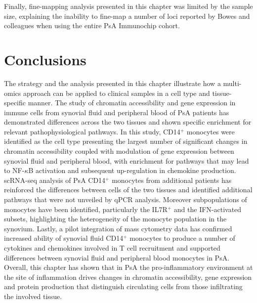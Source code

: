Finally, fine-mapping analysis presented in this chapter was limited by the sample size, explaining the inability to fine-map a number of loci reported by Bowes and colleagues when using the entire PsA Immunochip cohort.

\section{Conclusions}
The strategy and the analysis presented in this chapter illustrate how a multi-omics approach can be applied to clinical samples in a cell type and tissue-specific manner. The study of chromatin accessibility and gene expression in immune cells from synovial fluid and peripheral blood of PsA patients has demonstrated differences across the two tissues and shown specific enrichment for relevant pathophysiological pathways. %
In this study, CD14$^+$ monocytes were identified as the cell type presenting the largest number of significant changes in chromatin accessibility coupled with modulation of gene expression between synovial fluid and peripheral blood, with enrichment for pathways that may lead to NF-$\kappa$B activation and subsequent up-regulation in chemokine production. scRNA-seq analysis of PsA CD14$^+$ monocytes from additional patients has reinforced the differences between cells of the two tissues and identified additional pathways that were not unveiled by qPCR analysis. Moreover subpopulations of monocytes have been identified, particularly the IL7R$^+$ and the IFN-activated subsets, highlighting the heterogeneity of the monocyte population in the synovium. Lastly, a pilot integration of mass cytometry data has confirmed increased ability of synovial fluid CD14$^+$ monocytes to produce a number of cytokines and chemokines involved in T cell recruitment and supported differences between synovial fluid and peripheral blood monocytes in PsA. Overall, this chapter has shown that in PsA the pro-inflammatory environment at the site of inflammation drives changes in chromatin accessibility, gene expression and protein production that distinguish circulating cells from those infiltrating the involved tissue.



